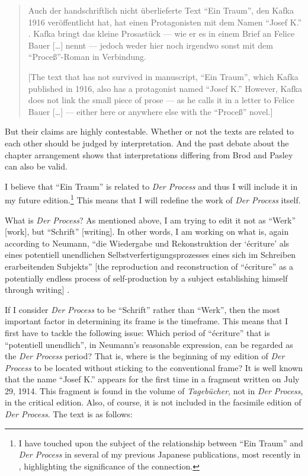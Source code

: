 \begin{paper}
\begin{quote}
Auch der handschriftlich nicht überlieferte Text ``Ein Traum'', den Kafka
1916 veröffentlicht hat, hat einen Protagonisten mit dem Namen ``Josef
K.'' . Kafka bringt das kleine Prosastück –– wie er es in einem Brief an
Felice Bauer [\ldots] nennt –– jedoch weder hier noch irgendwo sonst
mit dem ``Proceß''-Roman in Verbindung. 

\begin{flushright}
    \parencite[73]{kafka_zur_1990}
\end{flushright}

{[}The text that has not survived in manuscript, ``Ein Traum'', which
Kafka published in 1916, also has a protagonist named ``Josef K.''
However, Kafka does not link the small piece of prose –– as he calls it
in a letter to Felice Bauer [\ldots] –– either here or anywhere else
with the ``Proceß'' novel.{]}
\end{quote}

But their claims are highly contestable. Whether or not the texts are
related to each other should be judged by interpretation. And the past
debate about the chapter arrangement shows that interpretations
differing from Brod and Pasley can also be valid.

I believe that ``Ein Traum'' is related to \emph{Der Process} and thus I
will include it in my future edition.\footnote{I have touched upon the subject of the relationship between ``Ein Traum'' and \emph{Der Process} in several of my previous Japanese publications, most recently in \citet{myojo_kafka_2015}, highlighting the significance of the connection.} This means that I will redefine
the work of \emph{Der Process} itself.

What is \emph{Der Process}? As mentioned above, I am trying to edit it
not as ``Werk'' {[}work{]}, but ``Schrift'' {[}writing{]}. In other words, I am working on what
is, again according to Neumann, ``die Wiedergabe und Rekonstruktion der
`écriture' als eines potentiell unendlichen Selbstverfertigungsprozesses
eines sich im Schreiben erarbeitenden Subjekts'' {[}the reproduction
and reconstruction of ``écriture'' as a potentially endless process of
self-production by a subject establishing himself through writing{]}
\citep[161]{neumann_werk_1981}.

If I consider \emph{Der Process} to be ``Schrift'' rather than ``Werk'',
then the most important factor in determining its frame is the
timeframe. This means that I first have to tackle the following issue:
Which period of ``écriture'' that is ``potentiell unendlich'', in Neumann's
reasonable expression, can be regarded as the \emph{Der Process} period?
That is, where is the beginning of my edition of \emph{Der Process} to
be located without sticking to the conventional frame? It is well known
that the name ``Josef K.'' appears for the first time in a fragment
written on July 29, 1914. This fragment is found in the volume of
\emph{Tagebücher}, not in \emph{Der Process}, in the
critical edition. Also, of course, it is not included in the facsimile
edition of \emph{Der Process}. The text is as follows:


\end{paper}
